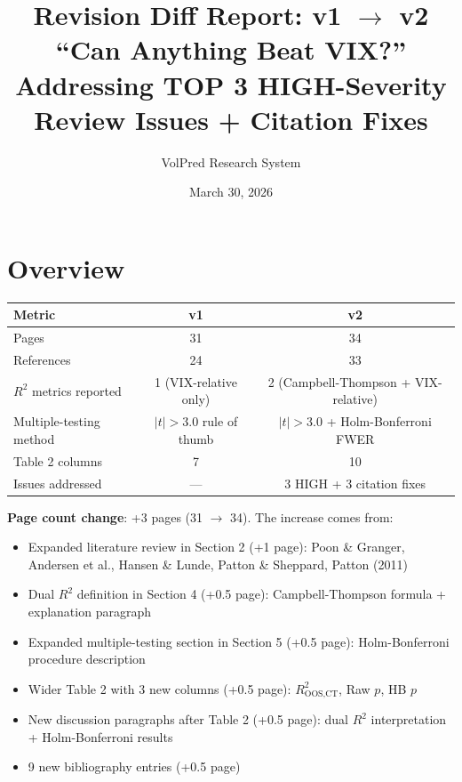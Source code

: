 \documentclass[12pt,a4paper]{article}
\title{Revision Diff Report: v1 $\rightarrow$ v2\\
\large ``Can Anything Beat VIX?''\\[6pt]
\normalsize Addressing TOP 3 HIGH-Severity Review Issues + Citation Fixes}
\author{VolPred Research System}
\date{March 30, 2026}
\begin{document}
\maketitle

\section{Overview}

\begin{tabular}{@{}lcc@{}}
\toprule
\textbf{Metric} & \textbf{v1} & \textbf{v2} \\
\midrule
Pages & 31 & 34 \\
References & 24 & 33 \\
$R^2$ metrics reported & 1 (VIX-relative only) & 2 (Campbell-Thompson + VIX-relative) \\
Multiple-testing method & $|t|>3.0$ rule of thumb & $|t|>3.0$ + Holm-Bonferroni FWER \\
Table 2 columns & 7 & 10 \\
Issues addressed & --- & 3 HIGH + 3 citation fixes \\
\bottomrule
\end{tabular}

\bigskip

\noindent\textbf{Page count change}: +3 pages (31 $\rightarrow$ 34). The increase comes from:
\begin{itemize}
    \item Expanded literature review in Section 2 (+1 page): Poon \& Granger, Andersen et al., Hansen \& Lunde, Patton \& Sheppard, Patton (2011)
    \item Dual $R^2$ definition in Section 4 (+0.5 page): Campbell-Thompson formula + explanation paragraph
    \item Expanded multiple-testing section in Section 5 (+0.5 page): Holm-Bonferroni procedure description
    \item Wider Table 2 with 3 new columns (+0.5 page): $R^2_{\text{OOS,CT}}$, Raw $p$, HB $p$
    \item New discussion paragraphs after Table 2 (+0.5 page): dual $R^2$ interpretation + Holm-Bonferroni results
    \item 9 new bibliography entries (+0.5 page)
\end{itemize}


\end{document}
